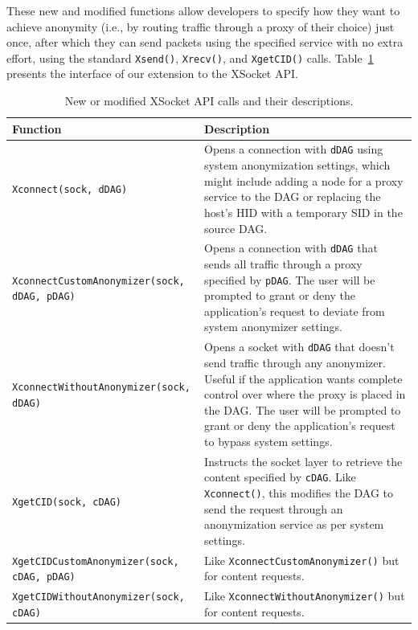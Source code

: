\documentclass{article}
\begin{document}
These new and modified functions allow developers to specify how they want to achieve anonymity (i.e., by routing traffic through a proxy of their choice) just once, after which they can send packets using the specified service with no extra effort, using the standard \texttt{Xsend()}, \texttt{Xrecv()}, and \texttt{XgetCID()} calls. Table~\ref{table:api-extension} presents the interface of our extension to the XSocket API.

\begin{table}
\centering
	\begin{tabular}{l p{7.5cm}}
	\textbf{Function} 	&	\textbf{Description}\\
	\hline
	\texttt{Xconnect(sock, dDAG)} & Opens a connection with \texttt{dDAG} using system anonymization settings, which might include adding a node for a proxy service to the DAG or replacing the host's HID with a temporary SID in the source DAG.\\
	\texttt{XconnectCustomAnonymizer(sock, dDAG, pDAG)} & Opens a connection with \texttt{dDAG} that sends all traffic through a proxy specified by \texttt{pDAG}. The user will be prompted to grant or deny the application's request to deviate from system anonymizer settings.\\
	\texttt{XconnectWithoutAnonymizer(sock, dDAG)} & Opens a socket with \texttt{dDAG} that doesn't send traffic through any anonymizer. Useful if the application wants complete control over where the proxy is placed in the DAG. The user will be prompted to grant or deny the application's request to bypass system settings.\\
	\texttt{XgetCID(sock, cDAG)} & Instructs the socket layer to retrieve the content specified by \texttt{cDAG}. Like \texttt{Xconnect()}, this modifies the DAG to send the request through an anonymization service as per system settings.\\
	\texttt{XgetCIDCustomAnonymizer(sock, cDAG, pDAG)} & Like \texttt{XconnectCustomAnonymizer()} but for content requests.\\
	\texttt{XgetCIDWithoutAnonymizer(sock, cDAG)} & Like \texttt{XconnectWithoutAnonymizer()} but for content requests.\\
	\hline
	\end{tabular}
	\caption{New or modified XSocket API calls and their descriptions.}
	\label{table:api-extension}
\end{table}
\end{document}
